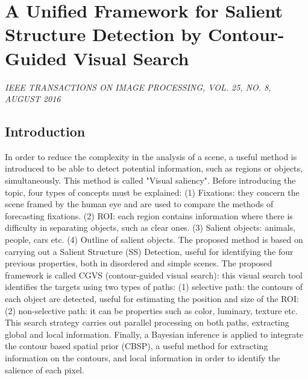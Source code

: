 \section{A Unified Framework for Salient Structure Detection by Contour-Guided Visual Search}

\begin{center}
    \author{
    Kai Fu Yang,
    Hui Li,
    Chao-Yi Li,
    and Young-Jie Li,
   \emph{Member}, 
    IEEE
}
\end{center}

\emph{IEEE TRANSACTIONS ON IMAGE PROCESSING, VOL. 25, NO. 8, AUGUST 2016}

\subsection{Introduction}
In order to reduce the complexity in the analysis of a scene, a useful method is introduced to be able to detect potential information, such as regions or objects, simultaneously. This method is called "Visual saliency". Before introducing the topic, four types of concepts must be explained: (1) Fixations: they concern the scene framed by the human eye and are used to compare the methods of forecasting fixations. (2) ROI: each region contains information where there is difficulty in separating objects, such as clear ones. (3) Salient objects: animals, people, cars etc. (4) Outline of salient objects. The proposed method is based on carrying out a Salient Structure (SS) Detection, useful for identifying the four previous properties, both in disordered and simple scenes. The proposed framework is called CGVS (contour-guided visual search): this visual search tool identifies the targets using two types of paths: (1) selective path: the contours of each object are detected, useful for estimating the position and size of the ROI: (2) non-selective path: it can be properties such as color, luminary, texture etc.
This search strategy carries out parallel processing on both paths, extracting global and local information. Finally, a Bayesian inference is applied to integrate the contour based spatial prior (CBSP), a useful method for extracting information on the contours, and local information in order to identify the salience of each pixel. 
